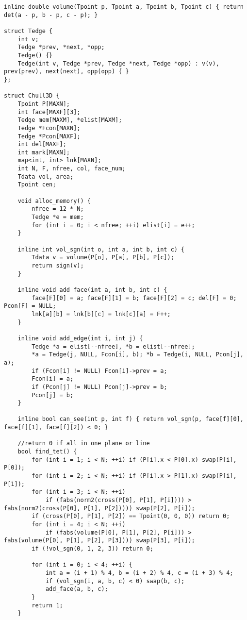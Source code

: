 \begin{verbatim}
inline double volume(Tpoint p, Tpoint a, Tpoint b, Tpoint c) { return det(a - p, b - p, c - p); }

struct Tedge {
    int v;
    Tedge *prev, *next, *opp;
    Tedge() {}
    Tedge(int v, Tedge *prev, Tedge *next, Tedge *opp) : v(v), prev(prev), next(next), opp(opp) { }
};

struct Chull3D {
    Tpoint P[MAXN];
    int face[MAXF][3];
    Tedge mem[MAXM], *elist[MAXM];
    Tedge *Fcon[MAXN];
    Tedge *Pcon[MAXF];
    int del[MAXF];
    int mark[MAXN];
    map<int, int> lnk[MAXN];
    int N, F, nfree, col, face_num;
    Tdata vol, area;
    Tpoint cen;

    void alloc_memory() {
        nfree = 12 * N;
        Tedge *e = mem;
        for (int i = 0; i < nfree; ++i) elist[i] = e++;
    }

    inline int vol_sgn(int o, int a, int b, int c) {
        Tdata v = volume(P[o], P[a], P[b], P[c]);
        return sign(v);
    }

    inline void add_face(int a, int b, int c) {
        face[F][0] = a; face[F][1] = b; face[F][2] = c; del[F] = 0; Pcon[F] = NULL;
        lnk[a][b] = lnk[b][c] = lnk[c][a] = F++;
    }

    inline void add_edge(int i, int j) {
        Tedge *a = elist[--nfree], *b = elist[--nfree];
        *a = Tedge(j, NULL, Fcon[i], b); *b = Tedge(i, NULL, Pcon[j], a);
        if (Fcon[i] != NULL) Fcon[i]->prev = a;
        Fcon[i] = a;
        if (Pcon[j] != NULL) Pcon[j]->prev = b;
        Pcon[j] = b;
    }

    inline bool can_see(int p, int f) { return vol_sgn(p, face[f][0], face[f][1], face[f][2]) < 0; }

    //return 0 if all in one plane or line
    bool find_tet() {
        for (int i = 1; i < N; ++i) if (P[i].x < P[0].x) swap(P[i], P[0]);
        for (int i = 2; i < N; ++i) if (P[i].x > P[1].x) swap(P[i], P[1]);
        for (int i = 3; i < N; ++i)
            if (fabs(norm2(cross(P[0], P[1], P[i]))) > fabs(norm2(cross(P[0], P[1], P[2])))) swap(P[2], P[i]);
        if (cross(P[0], P[1], P[2]) == Tpoint(0, 0, 0)) return 0;
        for (int i = 4; i < N; ++i)
            if (fabs(volume(P[0], P[1], P[2], P[i])) > fabs(volume(P[0], P[1], P[2], P[3]))) swap(P[3], P[i]);
        if (!vol_sgn(0, 1, 2, 3)) return 0;

        for (int i = 0; i < 4; ++i) {
            int a = (i + 1) % 4, b = (i + 2) % 4, c = (i + 3) % 4;
            if (vol_sgn(i, a, b, c) < 0) swap(b, c);
            add_face(a, b, c);
        }
        return 1;
    }


\end{verbatim}
